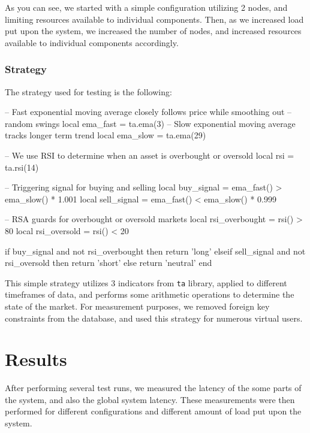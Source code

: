 As you can see, we started with a simple configuration utilizing 2 nodes, and limiting resources available to individual components. Then,
as we increased load put upon the system, we increased the number of nodes, and increased resources available to individual components
accordingly.

\subsubsection{Strategy}
The strategy used for testing is the following:


\begin{code}[language={[5.2]Lua},label={test_strategy},caption={Example strategy}]
-- Fast exponential moving average closely follows price while smoothing out
-- random swings
local ema_fast = ta.ema(3)
-- Slow exponential moving average tracks longer term trend
local ema_slow = ta.ema(29)

-- We use RSI to determine when an asset is overbought or oversold
local rsi = ta.rsi(14)

-- Triggering signal for buying and selling
local buy_signal = ema_fast() > ema_slow() * 1.001
local sell_signal = ema_fast() < ema_slow() * 0.999

-- RSA guards for overbought or oversold markets
local rsi_overbought = rsi() > 80
local rsi_oversold = rsi() < 20

if buy_signal and not rsi_overbought then
    return 'long'
elseif sell_signal and not rsi_oversold then
    return 'short'
else
    return 'neutral'
end
\end{code}


This simple strategy utilizes 3 indicators from \verb|ta| library, applied to different timeframes of data, and
performs some arithmetic operations to determine the state of the market. For measurement purposes, we removed foreign key
constraints from the database, and used this strategy for numerous virtual users.
\newpage

\section{Results}
After performing several test runs, we measured the latency of the some parts of the system, and also the global system
latency. These measurements were then performed for different configurations and different amount of load put upon the system.

